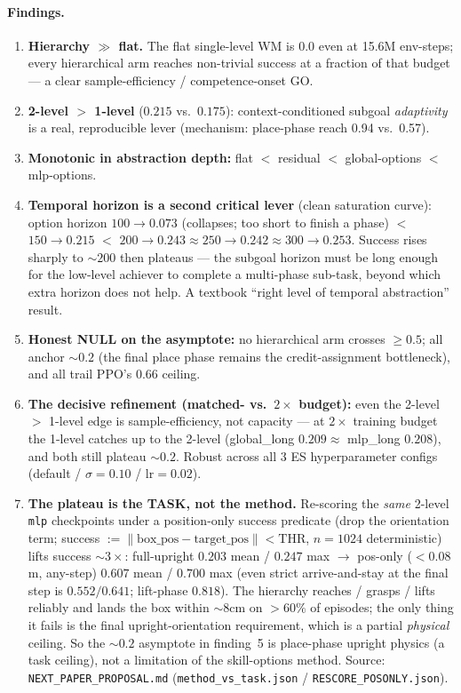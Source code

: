 \documentclass{article}
\begin{document}
\paragraph{Findings.}
\begin{enumerate}
  \item \textbf{Hierarchy $\gg$ flat.} The flat single-level WM is $0.0$ even at
  15.6M env-steps; every hierarchical arm reaches non-trivial success at a
  fraction of that budget --- a clear sample-efficiency / competence-onset GO.
  \item \textbf{2-level $>$ 1-level} ($0.215$ vs.\ $0.175$): context-conditioned
  subgoal \emph{adaptivity} is a real, reproducible lever (mechanism: place-phase
  reach 0.94 vs.\ 0.57).
  \item \textbf{Monotonic in abstraction depth:} flat $<$ residual $<$
  global-options $<$ mlp-options.
  \item \textbf{Temporal horizon is a second critical lever} (clean saturation
  curve): option horizon $100\to0.073$ (collapses; too short to finish a phase)
  $<$ $150\to0.215$ $<$ $200\to0.243 \approx 250\to0.242 \approx 300\to0.253$.
  Success rises sharply to ${\sim}200$ then plateaus --- the subgoal horizon must
  be long enough for the low-level achiever to complete a multi-phase sub-task,
  beyond which extra horizon does not help. A textbook ``right level of temporal
  abstraction'' result.
  \item \textbf{Honest NULL on the asymptote:} no hierarchical arm crosses
  $\geq 0.5$; all anchor ${\sim}0.2$ (the final place phase remains the
  credit-assignment bottleneck), and all trail PPO's 0.66 ceiling.
  \item \textbf{The decisive refinement (matched- vs.\ $2\times$ budget):} even
  the 2-level $>$ 1-level edge is sample-efficiency, not capacity --- at
  $2\times$ training budget the 1-level catches up to the 2-level (global\_long
  $0.209 \approx$ mlp\_long $0.208$), and both still plateau ${\sim}0.2$. Robust
  across all 3 ES hyperparameter configs (default / $\sigma{=}0.10$ / lr${=}0.02$).
  \item \textbf{The plateau is the TASK, not the method.} Re-scoring the
  \emph{same} 2-level \texttt{mlp} checkpoints under a position-only success
  predicate (drop the orientation term; success $:= \lVert\text{box\_pos} -
  \text{target\_pos}\rVert < \text{THR}$, $n=1024$ deterministic) lifts success
  ${\sim}3\times$: full-upright $0.203$ mean / $0.247$ max $\to$ pos-only
  ($<0.08$m, any-step) $0.607$ mean / $0.700$ max (even strict arrive-and-stay at
  the final step is $0.552/0.641$; lift-phase $0.818$). The hierarchy
  reaches / grasps / lifts reliably and lands the box within ${\sim}8$cm on
  $>60\%$ of episodes; the only thing it fails is the final upright-orientation
  requirement, which is a partial \emph{physical} ceiling. So the ${\sim}0.2$
  asymptote in finding~5 is place-phase upright physics (a task ceiling), not a
  limitation of the skill-options method. Source: \texttt{NEXT\_PAPER\_PROPOSAL.md}
  (\texttt{method\_vs\_task.json} / \texttt{RESCORE\_POSONLY.json}).
\end{enumerate}
\end{document}

